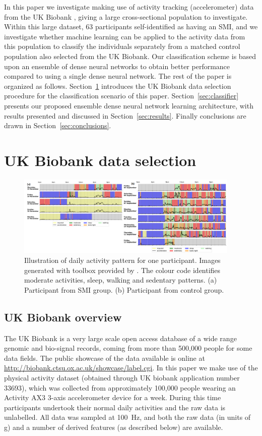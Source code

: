 \documentclass[letterpaper, 10pt, conference]{ieeeconf} %
\newcommand{\sect}[1]{Section~\ref{#1}}
\begin{document}
In this paper we investigate making use of activity tracking (accelerometer) data from the UK Biobank \cite{ref:jSUD15}, giving a large cross-sectional population to investigate. Within this large dataset, 63 participants self-identified as having an SMI, and we investigate whether machine learning can be applied to the activity data from this population to classify the individuals separately from a matched control population also selected from the UK Biobank. Our classification scheme is based upon an ensemble of dense neural networks to obtain better performance compared to using a single dense neural network. The rest of the paper is organized as follows. \sect{sec:background} introduces the UK Biobank data selection procedure for the classification scenario of this paper. \sect{sec:classifier} presents our proposed ensemble dense neural network learning architecture, with results presented and discussed in \sect{sec:results}. Finally conclusions are drawn in \sect{sec:conclusions}.

 
\section{UK Biobank data selection} \label{sec:background}
\begin{figure}
  \includegraphics[width=0.95\textwidth]{images/biobank.png}
  \caption{Illustration of daily activity pattern for one participant. Images generated with toolbox provided by \cite{Doherty2017}. The colour code identifies moderate activities, sleep, walking and sedentary patterns. (a) Participant from SMI group. (b) Participant from control group.}
  \label{fig:raw}
\end{figure}
 
  \subsection{UK Biobank overview}
  The UK Biobank is a very large scale open access database of a wide range genomic and bio-signal records, coming from more than 500,000 people for some data fields. The public showcase of the data available is online at \url{ http://biobank.ctsu.ox.ac.uk/showcase/label.cgi}. In this paper we make use of the physical activity dataset (obtained through UK biobank application number 33693), which was collected from approximately 100,000 people wearing an Activity AX3 3-axis accelerometer device \cite{ref:oAXI19} for a week. During this time participants undertook their normal daily activities and the raw data is unlabelled. All data was sampled at 100~Hz, and both the raw data (in units of g) and a number of derived features (as described below) are available. 
\end{document}
